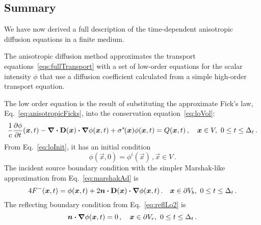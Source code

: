 \subsection{Summary}
We have now derived a full description of the time-dependent anisotropic
diffusion equations in a finite medium. 

The anisotropic diffusion method approximates the transport
equations~\eqref{eqs:fullTransport} with a set of low-order equations for the
scalar intensity $\phi$ that use a diffusion coefficient calculated from a
simple high-order transport equation.

The low order equation is the result of substituting the approximate Fick's law,
Eq.~\eqref{eq:anisotropicFicks}, into the conservation equation~\eqref{eq:loVol}:
\begin{equation*}
\frac{1}{c} \frac{\partial \phi}{\partial t} (\bm{x}, t)
  - \bm{\nabla} \bm{\cdot} \mathbf{D}(\bm{x}) \bm{\cdot} \bm{\nabla} \phi(\bm{x},t)
  + \sigma^{*\!}(\bm{x}) \phi(\bm{x}, t)
  = Q(\bm{x}, t) \,,
  \quad \bm{x} \in V,\ 0 \le t \le \Delta_t \,.
\end{equation*}
From Eq.~\eqref{eq:loInit}, it has an initial condition
\begin{equation*}
\phi(\vec{x}, 0) = \phi^i(\vec{x})\,, \vec{x} \in V  \,.
\end{equation*}
The incident source boundary condition with the simpler Marshak-like
approximation from Eq.~\eqref{eq:marshakAd} is
\begin{equation*}
  4 F^-(\bm{x}, t)
  = \phi(\bm{x}, t)
  + 2 \bm{n} \bm{\cdot} \mathbf{D}(\bm{x}) \bm{\cdot} \bm{\nabla} \phi(\bm{x}, t) \,.
 \quad \bm{x} \in \partial V_b,\ 0 \le t \le \Delta_t \,.
\end{equation*}
The reflecting boundary condition from Eq.~\eqref{eq:reflLo2} is
\begin{equation*}
  \bm{n}\bm{\cdot}\bm{\nabla} \phi(\bm{x}, t) = 0 \,,
 \quad \bm{x} \in \partial V_r,\ 0 \le t \le \Delta_t \,.
\end{equation*}

